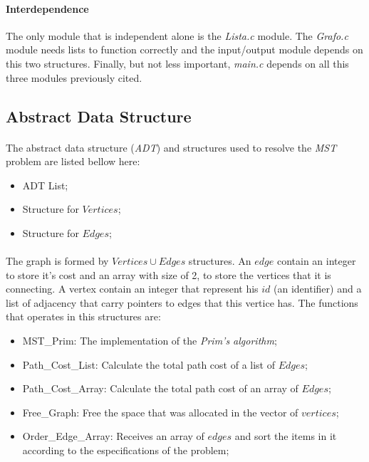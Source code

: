 \documentclass[titlepage]{article}
\begin{document}
        \paragraph{Interdependence}The only module that is independent alone is the \emph{Lista.c} module. The \emph{Grafo.c} module needs lists to function correctly and the input/output module depends on this two structures. Finally, but not less important, \emph{main.c} depends on all this three modules previously cited.
        \subsection{Abstract Data Structure}
        \paragraph{}
        The abstract data structure (\emph{ADT}) and structures used to resolve the \emph{MST} problem are listed bellow here:
        \begin{itemize}
            \item ADT List;
            \item Structure for $Vertices$;
            \item Structure for $Edges$;
        \end{itemize} 
        \paragraph{}
        The graph is formed by ${Vertices \cup Edges}$ structures. An $edge$ contain an integer to store it's cost and an array with size of 2, to store the vertices that it is connecting. A vertex contain an integer that represent his $id$ (an identifier) and a list of adjacency that carry pointers to edges that this vertice has. The functions that operates in this structures are:
        \begin{itemize}
            \item MST\_Prim: The implementation of the \emph{Prim's algorithm};
            \item Path\_Cost\_List: Calculate the total path cost of a list of $Edges$;
            \item Path\_Cost\_Array: Calculate the total path cost of an array of $Edges$;
            \item Free\_Graph: Free the space that was allocated in the vector of $vertices$;
            \item Order\_Edge\_Array: Receives an array of $edges$ and sort the items in it according to the especifications of the problem; 
        \end{itemize}
\end{document}
